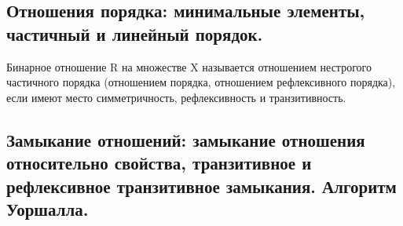 \documentclass[a4paper, 12pt]{article}
\begin{document}
\subsection{ Отношения порядка: минимальные элементы, частичный и линейный порядок.}

Бинарное отношение R на множестве X называется отношением нестрогого частичного порядка (отношением порядка, отношением рефлексивного порядка), если имеют место симметричность, рефлексивность и транзитивность.

\subsection{Замыкание отношений: замыкание отношения относительно свойства, транзитивное и рефлексивное транзитивное замыкания. Алгоритм Уоршалла.}
\end{document}
